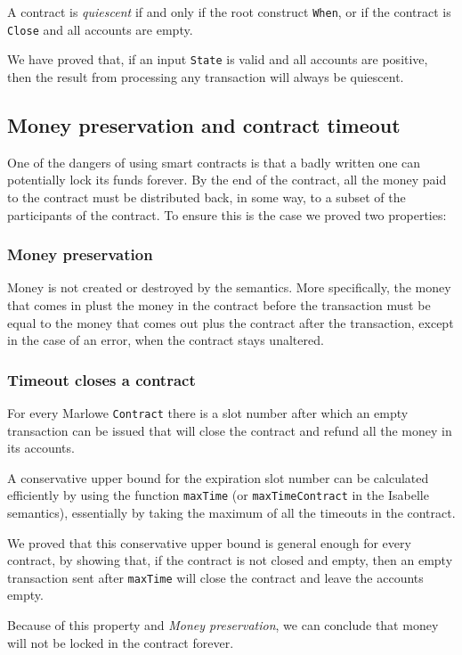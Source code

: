 \documentclass[runningheads]{llncs}
\begin{document}
A contract is \emph{quiescent} if and only if the root construct \texttt{When}, or if the contract is \texttt{Close} and all accounts are empty.

We have proved that, if an input \texttt{State} is valid and all accounts are positive, then the result from processing any transaction will always be quiescent.

\subsection{Money preservation and contract timeout}

One of the dangers of using smart contracts is that a badly written one can potentially lock its funds forever. By the end of the contract, all the money paid to the contract must be distributed back, in some way, to a subset of the participants of the contract.
To ensure this is the case we proved two properties:

\subsubsection{Money preservation}
Money is not created or destroyed by the semantics. More specifically, the money that comes in plust the money in the contract before the transaction must be equal to the money that comes out plus the contract after the transaction, except in the case of an error, when the contract stays unaltered.

\subsubsection{Timeout closes a contract}

For every Marlowe \texttt{Contract} there is a slot number after which an empty transaction can be issued that will close the contract and refund all the money in its accounts.

A conservative upper bound for the expiration slot number can be calculated efficiently by using the function \texttt{maxTime} (or \texttt{maxTimeContract} in the Isabelle semantics), essentially by taking the maximum of all the timeouts in the contract.

We proved that this conservative upper bound is general enough for every contract, by showing that, if the contract is not closed and empty, then an empty transaction sent after \texttt{maxTime} will close the contract and leave the accounts empty.

Because of this property and \emph{Money preservation}, we can conclude that money will not be locked in the contract forever.
\end{document}
